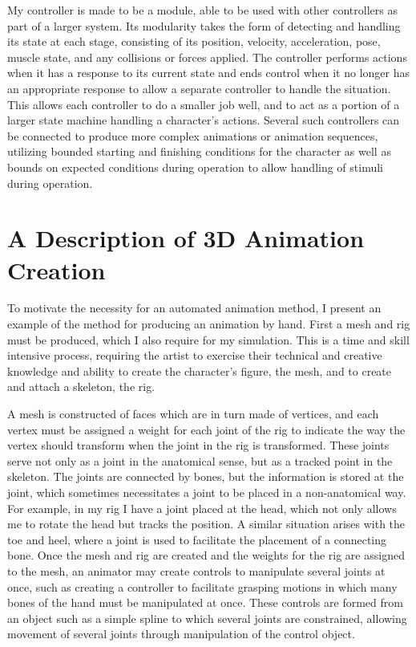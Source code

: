 My controller is made to be a module, able to be used with other controllers as part of a larger system.  Its modularity takes the form of detecting and handling its state at each stage, consisting of its position, velocity, acceleration, pose, muscle state, and any collisions or forces applied. The controller performs actions when it has a response to its current state and ends control when it no longer has an appropriate response to allow a separate controller to handle the situation.  This allows each controller to do a smaller job well, and to act as a portion of a larger state machine handling a character's actions. Several such controllers can be connected to produce more complex animations or animation sequences, utilizing bounded starting and finishing conditions for the character as well as bounds on expected conditions during operation to allow handling of stimuli during operation.


 
\section{A Description of 3D Animation Creation}
\label{section:anim_ex}
To motivate the necessity for an automated animation method, I present an example of the method for producing an animation by hand.  First a mesh and rig must be produced, which I also require for my simulation.  This is a time and skill intensive process, requiring the artist to exercise their technical and creative knowledge and ability to create the character's figure, the mesh, and to create and attach a skeleton, the rig.  

A mesh is constructed of faces which are in turn made of vertices, and each vertex must be assigned a weight for each joint of the rig to indicate the way the vertex should transform when the joint in the rig is transformed.  These joints serve not only as a joint in the anatomical sense, but as a tracked point in the skeleton.  The joints are connected by bones, but the information is stored at the joint, which sometimes necessitates a joint to be placed in a non-anatomical way.  For example, in my rig I have a joint placed at the head, which not only allows me to rotate the head but tracks the position.  A similar situation arises with the toe and heel, where a joint is used to facilitate the placement of a connecting bone.  Once the mesh and rig are created and the weights for the rig are assigned to the mesh, an animator may create controls to manipulate several joints at once, such as creating a controller to facilitate grasping motions in which many bones of the hand must be manipulated at once.  These controls are formed from an object such as a simple spline to which several joints are constrained, allowing movement of several joints through manipulation of the control object.


